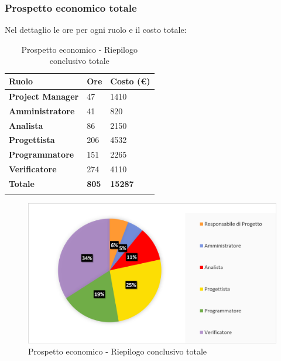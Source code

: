 \subsubsection{Prospetto economico totale}
Nel dettaglio le ore per ogni ruolo e il costo totale: 
\begin{center}
	\def\arraystretch{1.6}
	\bgroup
	\begin{longtable}{| p{4cm} | p{1cm} | p{2cm} |}
		\hline
		\textbf{Ruolo} & \textbf{Ore} & \textbf{Costo (€)} \\ 
		
		\hline \hline  
		
		\textbf{Project Manager} & {47} & {1410} \\ 
		\hline 
		
		\textbf{Amministratore} & {41} & {820} \\ 
		\hline 
		
		\textbf{Analista} & {86} & {2150} \\ 
		\hline 
		
		\textbf{Progettista} & {206} & {4532} \\ 
		\hline 
		
		\textbf{Programmatore} & {151} & {2265} \\ 
		\hline 
		
		\textbf{Verificatore} & {274} & {4110} \\ 
		\hline 
		
		\textbf{Totale} & \textbf{805} & \textbf{15287} \\ 
		\hline 
		
		
		\hline 
		
		\caption{Prospetto economico - Riepilogo conclusivo totale}
	\end{longtable}
	\egroup
\end{center}
\begin{figure}[H]
	\centering
	\includegraphics[width= 14cm]{immagini/tot_torta.png}
	\caption{Prospetto economico - Riepilogo conclusivo totale}
\end{figure}
\newpage

